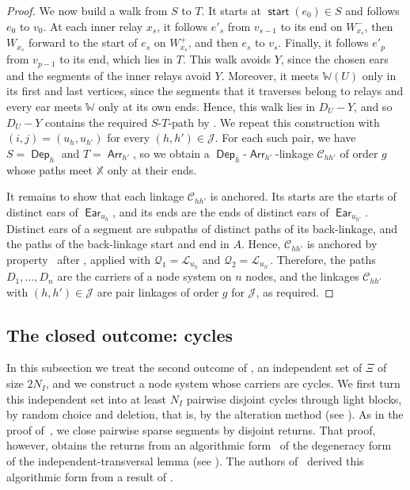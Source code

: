 \documentclass[fontsize=12pt,leading=14pt]{fullpaper}
\DeclareMathOperator{\st}{\mathsf{start}}
\DeclareMathOperator{\Arr}{\mathsf{Arr}}
\DeclareMathOperator{\Dep}{\mathsf{Dep}}
\DeclareMathOperator{\Ear}{\mathsf{Ear}}
\newcommand{\Ccal}{\mathcal{C}}
\newcommand{\Jcal}{\mathcal{J}}
\newcommand{\Lcal}{\mathcal{L}}
\newcommand{\Qcal}{\mathcal{Q}}
\newcommand{\XX}{\mathbb{X}}
\newcommand{\WW}{\mathbb{W}}
\begin{document}
\begin{proof}
  We now build a walk from $S$ to $T$.
  It starts at $\st(e_0)\in S$ and follows $e_0$ to $v_0$.
  At each inner relay $x_s$, it follows $e'_s$ from $v_{s-1}$ to its end on $W_{x_s}^-$, then $W_{x_s}$ forward to the start of $e_s$ on $W_{x_s}^+$, and then $e_s$ to $v_s$.
  Finally, it follows $e'_p$ from $v_{p-1}$ to its end, which lies in $T$.
  This walk avoids $Y$, since the chosen ears and the segments of the inner relays avoid $Y$.
  Moreover, it meets $\WW(U)$ only in its first and last vertices, since the segments that it traverses belong to relays and every ear meets $\WW$ only at its own ends.
  Hence, this walk lies in $D_U-Y$, and so $D_U-Y$ contains the required $S$-$T$-path by .
  We repeat this construction with $(i,j)=(u_h,u_{h'})$ for every $(h,h')\in\Jcal$.
  For each such pair, we have $S=\Dep_h$ and $T=\Arr_{h'}$, so we obtain a $\Dep_h$-$\Arr_{h'}$-linkage $\Ccal_{hh'}$ of order $g$ whose paths meet $\XX$ only at their ends.

  It remains to show that each linkage $\Ccal_{hh'}$ is anchored.
  Its starts are the starts of distinct ears of $\Ear_{u_h}$, and its ends are the ends of distinct ears of $\Ear_{u_{h'}}$.
  Distinct ears of a segment are subpaths of distinct paths of its back-linkage, and the paths of the back-linkage start and end in $A$.
  Hence, $\Ccal_{hh'}$ is anchored by property~ after , applied with $\Qcal_1=\Lcal_{u_h}$ and $\Qcal_2=\Lcal_{u_{h'}}$.
  Therefore, the paths $D_1,\dots,D_n$ are the carriers of a node system on $n$ nodes, and the linkages $\Ccal_{hh'}$ with $(h,h')\in\Jcal$ are pair linkages of order $g$ for $\Jcal$, as required.
\end{proof}

\subsection{The closed outcome: cycles}\label{sec:prep-closed}

In this subsection we treat the second outcome of , an independent set of $\Xi$ of size $2N_I$, and we construct a node system whose carriers are cycles.
We first turn this independent set into at least $N_I$ pairwise disjoint cycles through light blocks, by random choice and deletion, that is, by the alteration method (see \textcite[Chapter~3]{AlonSpencer08}).
As in the proof of~\cite[Lemma~4.13]{CLNS26}, we close pairwise sparse segments by disjoint returns.
That proof, however, obtains the returns from an algorithmic form~\cite[Proposition~3.9]{CLNS26} of the degeneracy form~\cite[Lemma~4.3]{RW12} of the independent-transversal lemma (see ).
The authors of~\cite{CLNS26} derived this algorithmic form from a result of \textcite[Theorem~1.5]{Harris22}.
\end{document}
